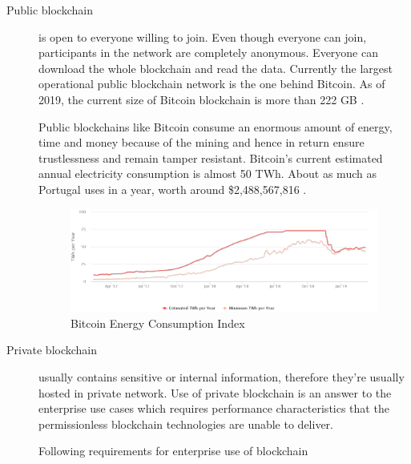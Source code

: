 \begin{description}

\item[Public blockchain] is open to everyone willing to join. Even though everyone can join, participants in the network are completely anonymous. Everyone can download the whole blockchain and read the data. Currently the largest operational public blockchain network is the one behind Bitcoin. As of 2019, the current size of Bitcoin blockchain is more than 222 GB \cite{blockchain_size}. 

Public blockchains like Bitcoin consume an enormous amount of energy, time and money because of the mining and hence in return ensure trustlessness and remain tamper resistant. Bitcoin's current estimated annual electricity consumption is almost 50 TWh. About as much as Portugal uses in a year, worth around \$2,488,567,816  \cite{Bitcoin_Energy}. 


\begin{figure}[H]
    \begin{left}
        \begin{minipage}{\linewidth}
            \begin{left}
                \includegraphics[width=\textwidth,keepaspectratio]{img/Bitcoin_Energy_Consumption_Index.png}
                \caption{Bitcoin Energy Consumption Index}
                \label{obr 1.3.1}
            \end{left}
        \end{minipage}
    \end{left}
\end{figure}



\item[Private blockchain] usually contains sensitive or internal information, therefore they're usually hosted in private network. Use of private blockchain is an answer to the enterprise use cases which requires performance characteristics that the permissionless blockchain technologies are unable to deliver.  

Following requirements for enterprise use of blockchain


\end{description}
